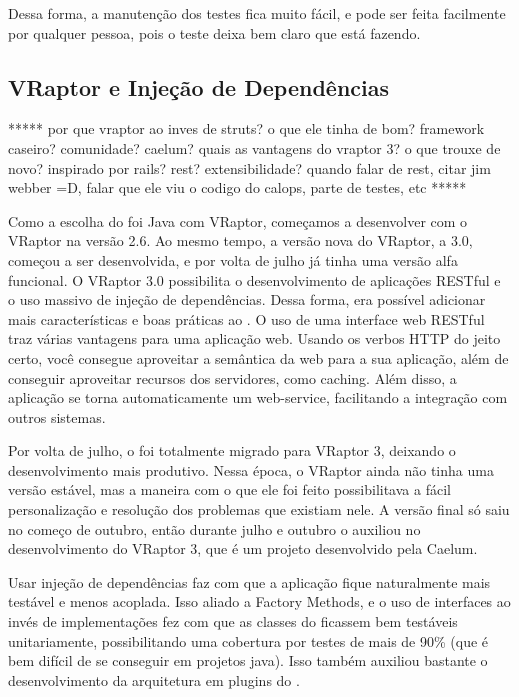 Dessa forma, a manutenção dos testes fica muito fácil, e pode ser feita facilmente por qualquer pessoa, pois o 
teste deixa bem claro que está fazendo.


\subsection{VRaptor e Injeção de Dependências}

*****
por que vraptor ao inves de struts? o que ele tinha de bom? framework caseiro? comunidade? caelum?
quais as vantagens do vraptor 3? o que trouxe de novo? inspirado por rails? rest? extensibilidade?
quando falar de rest, citar jim webber =D, falar que ele viu o codigo do calops, parte de testes, etc
*****

Como a escolha do \calopsita foi Java com VRaptor, começamos a desenvolver com o VRaptor na versão 2.6. 
Ao mesmo tempo, a versão nova do VRaptor, a 3.0, começou a ser desenvolvida, e por volta de julho já tinha 
uma versão alfa funcional. O VRaptor 3.0 possibilita o desenvolvimento de aplicações RESTful \cite{rest}
e o uso massivo de injeção de dependências\cite{di}. Dessa forma, era possível adicionar mais 
características e boas práticas ao \calopsita. O uso de uma interface web RESTful traz várias vantagens para 
uma aplicação web. Usando os verbos HTTP do jeito certo, você consegue aproveitar a semântica da web para a 
sua aplicação, além de conseguir aproveitar recursos dos servidores, como caching. Além disso, a aplicação 
se torna automaticamente um web-service, facilitando a integração com outros sistemas.

Por volta de julho, o \calopsita foi totalmente migrado para VRaptor 3, deixando o desenvolvimento mais produtivo. 
Nessa época, o VRaptor ainda não tinha uma versão estável, mas a maneira com o que ele foi feito possibilitava a fácil
personalização e resolução dos problemas que existiam nele. A versão final só saiu no começo de outubro, então durante 
julho e outubro o \calopsita auxiliou no desenvolvimento do VRaptor 3, que é um projeto \opensource desenvolvido pela Caelum.

Usar injeção de dependências faz com que a aplicação fique naturalmente mais testável e menos acoplada. Isso aliado a
Factory Methods\cite{gof}, e o uso de interfaces ao invés de implementações \cite{effective} fez com que as
 classes do \calopsita ficassem bem testáveis unitariamente, possibilitando 
uma cobertura por testes de mais de 90\% (que é bem difícil de se conseguir em projetos java). Isso também auxiliou bastante
o desenvolvimento da arquitetura em plugins do \calopsita.

